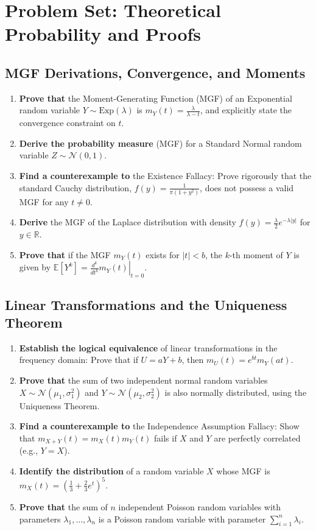 \documentclass[11pt, a4paper]{article}
\theoremstyle{definition}
\theoremstyle{remark}
\newcommand{\R}{\mathbb{R}}
\newcommand{\E}{\mathbb{E}}
\begin{document}
\newpage

\section{Problem Set: Theoretical Probability and Proofs}

\subsection{MGF Derivations, Convergence, and Moments}
\begin{enumerate}[label=\textbf{\arabic*.}]
    \item \textbf{Prove that} the Moment-Generating Function (MGF) of an Exponential random variable $Y \sim \text{Exp}(\lambda)$ is $m_Y(t) = \frac{\lambda}{\lambda - t}$, and explicitly state the convergence constraint on $t$.
    \item \textbf{Derive the probability measure} (MGF) for a Standard Normal random variable $Z \sim \mathcal{N}(0,1)$. 
    \item \textbf{Find a counterexample to} the Existence Fallacy: Prove rigorously that the standard Cauchy distribution, $f(y) = \frac{1}{\pi(1+y^2)}$, does not possess a valid MGF for any $t \neq 0$.
    \item \textbf{Derive} the MGF of the Laplace distribution with density $f(y) = \frac{\lambda}{2} e^{-\lambda|y|}$ for $y \in \R$.
    \item \textbf{Prove that} if the MGF $m_Y(t)$ exists for $|t| < b$, the $k$-th moment of $Y$ is given by $\E[Y^k] = \left. \frac{d^k}{dt^k} m_Y(t) \right|_{t=0}$.
\end{enumerate}

\subsection{Linear Transformations and the Uniqueness Theorem}
\begin{enumerate}[label=\textbf{\arabic*.}, resume]
    \item \textbf{Establish the logical equivalence} of linear transformations in the frequency domain: Prove that if $U = aY + b$, then $m_U(t) = e^{bt} m_Y(at)$.
    \item \textbf{Prove that} the sum of two independent normal random variables $X \sim \mathcal{N}(\mu_1, \sigma_1^2)$ and $Y \sim \mathcal{N}(\mu_2, \sigma_2^2)$ is also normally distributed, using the Uniqueness Theorem.
    \item \textbf{Find a counterexample to} the Independence Assumption Fallacy: Show that $m_{X+Y}(t) = m_X(t)m_Y(t)$ fails if $X$ and $Y$ are perfectly correlated (e.g., $Y = X$).
    \item \textbf{Identify the distribution} of a random variable $X$ whose MGF is $m_X(t) = \left(\frac{1}{3} + \frac{2}{3}e^t\right)^5$.
    \item \textbf{Prove that} the sum of $n$ independent Poisson random variables with parameters $\lambda_1, \dots, \lambda_n$ is a Poisson random variable with parameter $\sum_{i=1}^n \lambda_i$.
\end{enumerate}
\end{document}
